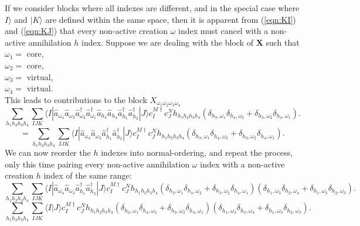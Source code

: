 \documentclass[12pt]{article}
\begin{document}
\noindent If we consider blocks where all indexes are different,
and in the special case where $I\rangle$ and $|K\rangle$ are defined within the same space,
then it is apparent from (\ref{eqn:KI}) and  (\ref{eqn:KJ}) that every non-active creation $\omega$ index must
cancel with a non-active annihilation $h$ index. Suppose we are dealing with the block of $\mathbf{X}$ such that \\
$\omega_{1} = $ core,\\  
$\omega_{2} = $ core,   \\
$\omega_{3} = $ virtual, \\
$\omega_{4} = $ virtual.\\ 
\noindent  This leads to contributions to the block $X_{\omega_{1}\omega_{2}\omega_{3}\omega_{4}}$ 
\begin{equation*}
\sum_{h_{1}h_{2}h_{3}h_{4}} 
\sum_{IJK}
\langle I |
\hat{a}_{\omega_{4}} \hat{a}_{\omega_{3}}\hat{a}^{\dagger}_{\omega_{2}}\hat{a}^{\dagger}_{\omega_{1}}
\hat{a}_{h_{3}}\hat{a}_{h_{4}}\hat{a}^{\dagger}_{h_{1}} \hat{a}^{\dagger}_{h_{2}}| J \rangle  
c^{M \dagger}_{I}c^{N}_{J} h_{h_{1}h_{2}h_{3}h_{4}}( \delta_{h_{3},\omega_{1}}\delta_{h_{4},\omega_{2}} +  \delta_{h_{3},\omega_{2}}\delta_{h_{4},\omega_{1}} ).
\end{equation*}
\begin{equation}
=\sum_{h_{1}h_{2}h_{3}h_{4}} 
\sum_{IJK}
\langle I |
\hat{a}_{\omega_{4}} \hat{a}_{\omega_{3}}\hat{a}^{\dagger}_{h_{1}} \hat{a}^{\dagger}_{h_{2}}| J \rangle  
c^{M \dagger}_{I}c^{N}_{J} h_{h_{1}h_{2}h_{3}h_{4}}( \delta_{h_{3},\omega_{1}}\delta_{h_{4},\omega_{2}} +  \delta_{h_{3},\omega_{2}}\delta_{h_{4},\omega_{1}} ).
\label{eqn:XRIHmatch}
\end{equation}
\noindent We can now reorder the $h$ indexes into normal-ordering, and repeat the process, only this time pairing every non-active annihilation
$\omega$ index with a non-active creation $h$ index of the same range:
\begin{equation*}
\sum_{h_{1}h_{2}h_{3}h_{4}} 
\sum_{IJK}
\langle I |
\hat{a}_{\omega_{4}} \hat{a}_{\omega_{3}}\hat{a}^{\dagger}_{h_{1}} \hat{a}^{\dagger}_{h_{2}}| J \rangle  
c^{M \dagger}_{I}c^{N}_{J} h_{h_{1}h_{2}h_{3}h_{4}}
( \delta_{h_{3},\omega_{1}}\delta_{h_{4},\omega_{2}} +  \delta_{h_{3},\omega_{2}}\delta_{h_{4},\omega_{1}} )
( \delta_{h_{1},\omega_{3}}\delta_{h_{2},\omega_{4}} +  \delta_{h_{1},\omega_{3}}\delta_{h_{2},\omega_{3}} ).
\end{equation*}
\begin{equation}
\sum_{h_{1}h_{2}h_{3}h_{4}} 
\sum_{IJK}
\langle I|J\rangle c^{M \dagger}_{I}
c^{N}_{J} h_{h_{1}h_{2}h_{3}h_{4}}
( \delta_{h_{3},\omega_{1}}\delta_{h_{4},\omega_{2}} +  \delta_{h_{3},\omega_{2}}\delta_{h_{4},\omega_{1}} )
( \delta_{h_{1},\omega_{3}}\delta_{h_{2},\omega_{4}} +  \delta_{h_{1},\omega_{3}}\delta_{h_{2},\omega_{3}} ).
\label{eqn:XRIHmatch2}
\end{equation}
\end{document}

